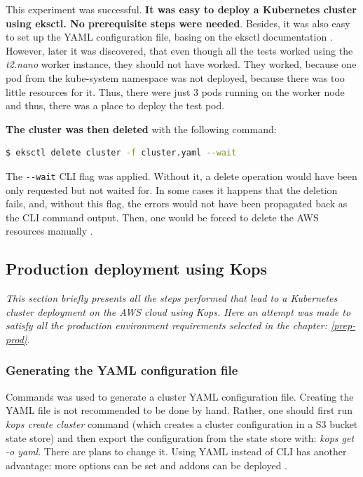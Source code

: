 This experiment was successful. \textbf{It was easy to deploy a Kubernetes cluster using eksctl. No prerequisite steps were needed}. Besides, it was also easy to set up the YAML configuration file, basing on the eksctl documentation \cite{eksctl-creating-clusters}. However, later it was discovered, that even though all the tests worked using the \textit{t2.nano} worker instance, they should not have worked. They worked, because one pod from the kube-system namespace was not deployed, because there was too little resources for it. Thus, there were just 3 pods running on the worker node and thus, there was a place to deploy the test pod.


\textbf{The cluster was then deleted} with the following command:
\begin{lstlisting}[basicstyle=\tiny,caption={Command used to delete Kubernetes cluster with eksctl},captionpos=b,language=Bash,xleftmargin=1cm]
$ eksctl delete cluster -f cluster.yaml --wait
\end{lstlisting}

The \verb|--wait| CLI flag was applied. Without it, a delete operation would have been only requested but not waited for. In some cases it happens that the deletion fails, and, without this flag, the errors would not have been propagated back as the CLI command output. Then, one would be forced to delete the AWS resources manually \cite{eksctl-creating-clusters}.


\subsection{Production deployment using Kops}
\textit{This section briefly presents all the steps performed that lead to a Kubernetes cluster deployment on the AWS cloud using Kops. Here an attempt was made to satisfy all the production environment requirements selected in the chapter: \ref{prep-prod}.}
\\

\subsubsection{Generating the YAML configuration file}
Commands was used to generate a cluster YAML configuration file. Creating the YAML file is not recommended to be done by hand. Rather, one should first run \textit{kops create cluster} command (which creates a cluster configuration in a S3 bucket state store) and then export the configuration from the state store with: \textit{kops get -o yaml}. There are plans to change it. Using YAML instead of CLI has another advantage: more options can be set \cite{online-kops-manifest} and addons can be deployed \cite{online-kops-addons}.

